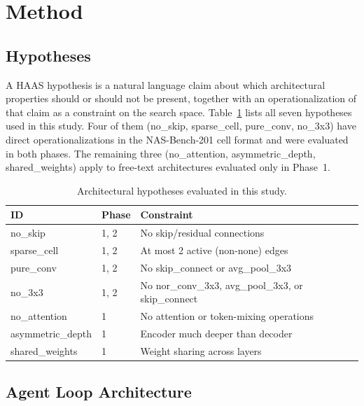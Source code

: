 \documentclass[10pt]{article}
\newcommand{\haas}{\textsc{HAAS}}
\newcommand{\nasbench}{NAS-Bench-201}
\begin{document}
\section{Method}
\label{sec:method}

\subsection{Hypotheses}
\label{sec:hypotheses}

A \haas{} hypothesis is a natural language claim about which architectural
properties should or should not be present, together with an operationalization
of that claim as a constraint on the search space. Table~\ref{tab:hypotheses}
lists all seven hypotheses used in this study. Four of them (no\_skip,
sparse\_cell, pure\_conv, no\_3x3) have direct operationalizations in the
\nasbench{} cell format and were evaluated in both phases. The remaining three
(no\_attention, asymmetric\_depth, shared\_weights) apply to free-text
architectures evaluated only in Phase~1.

\begin{table}[t]
\caption{Architectural hypotheses evaluated in this study.}
\label{tab:hypotheses}
\begin{center}
\small
\begin{tabular}{llp{5.5cm}}
\toprule
\textbf{ID} & \textbf{Phase} & \textbf{Constraint} \\
\midrule
no\_skip          & 1, 2 & No skip/residual connections \\
sparse\_cell      & 1, 2 & At most 2 active (non-none) edges \\
pure\_conv        & 1, 2 & No skip\_connect or avg\_pool\_3x3 \\
no\_3x3           & 1, 2 & No nor\_conv\_3x3, avg\_pool\_3x3, or skip\_connect \\
no\_attention     & 1    & No attention or token-mixing operations \\
asymmetric\_depth & 1    & Encoder much deeper than decoder \\
shared\_weights   & 1    & Weight sharing across layers \\
\bottomrule
\end{tabular}
\end{center}
\end{table}

\subsection{Agent Loop Architecture}
\label{sec:loop}
\end{document}
